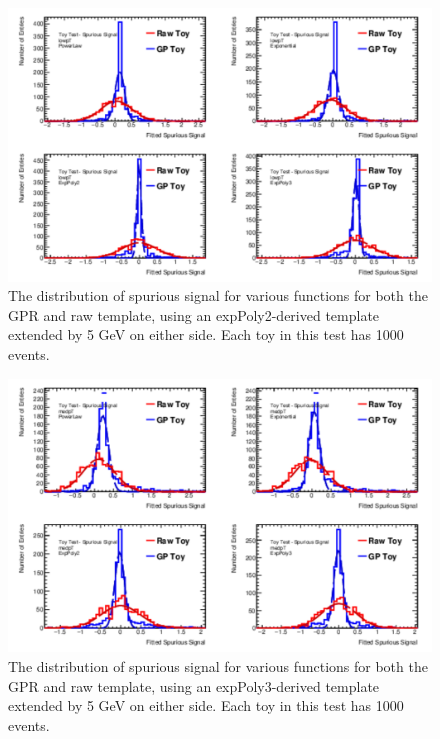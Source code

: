 \begin{figure} 
\begin{center}
  \includegraphics[width=\textwidth]{figures/background/gpr/validation/padded/ToyTest_FitSigVals_lowpT_1000_noSig}   
\caption{The distribution of spurious signal for various functions for both the GPR and raw template, using an expPoly2-derived template extended by 5 GeV on either side. Each toy in this test has 1000 events.}
\label{fig:padded_lowpt_1000_noSig}
\end{center}
\end{figure}

\begin{figure} 
\begin{center}
  \includegraphics[width=\textwidth]{figures/background/gpr/validation/padded/ToyTest_FitSigVals_medpT_1000_noSig}   
\caption{The distribution of spurious signal for various functions for both the GPR and raw template, using an expPoly3-derived template extended by 5 GeV on either side. Each toy in this test has 1000 events.}
\label{fig:padded_medpt_1000_noSig}
\end{center}
\end{figure}

